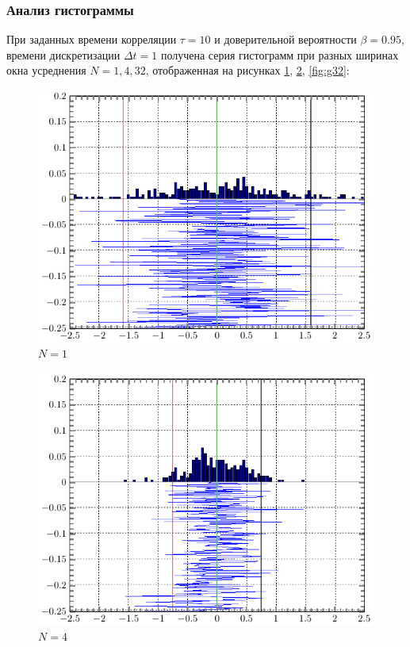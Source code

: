 \documentclass[a4paper,14pt]{extarticle}
\begin{document}
\subsubsection{Анализ гистограммы}
При заданных времени корреляции $\tau = 10$ и доверительной вероятности $\beta=0.95$, времени дискретизации $\Delta t=1$ получена серия гистограмм при разных ширинах окна усреднения $N=1, 4, 32$, отображенная на рисунках \ref{fig:g1}, \ref{fig:g4}, \ref{fig:g32}:
\vfill
\begin{figure}[H]
    \centering
    \includegraphics[width=0.75\linewidth]{fig/gist_n1}
    \vspace{-0.7em}
    \caption{$N=1$}
    \label{fig:g1}
\end{figure}
\vfill
\newpage
\begin{figure}[H]
    \centering
    \includegraphics[width=0.75\linewidth]{fig/gist_n4}
    \vspace{-0.7em}
    \caption{$N=4$}
    \label{fig:g4}
\end{figure}
\end{document}
